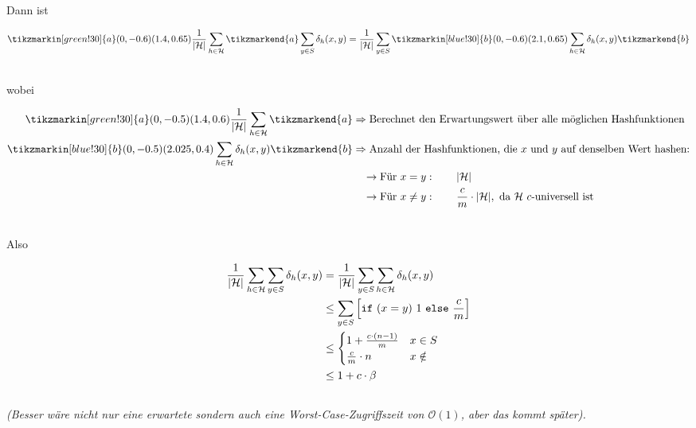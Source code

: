 \documentclass{scrartcl}%
\begin{document}
    Dann ist

    \begin{equation*}
        \begin{align*}
            \tikzmarkin[green!30]{a}(0,-0.6)(1.4,0.65) \frac{1}{|\mathcal{H}|} \sum_{h \in \mathcal{H}}\tikzmarkend{a}
            \sum_{y \in S}\delta_h(x,y) &= \frac{1}{|\mathcal{H}|}\sum_{y \in S} \tikzmarkin[blue!30]{b}(0,-0.6)(2.1,0.65)\sum_{h \in \mathcal{H}}\delta_h(x,y)\tikzmarkend{b} \\\nonumber
        \end{align*}
    \end{equation*}

    wobei

    \begin{equation*}
        \begin{align*}
            \tikzmarkin[green!30]{a}(0,-0.5)(1.4,0.6) \frac{1}{|\mathcal{H}|} \sum_{h \in \mathcal{H}}\tikzmarkend{a}
            &\Rightarrow \text{Berechnet den Erwartungswert über alle möglichen Hashfunktionen}  \\\nonumber
            \tikzmarkin[blue!30]{b}(0,-0.5)(2.025,0.4)\sum_{h \in \mathcal{H}}\delta_h(x,y)\tikzmarkend{b}
            &\Rightarrow \text{Anzahl der Hashfunktionen, die $x$ und $y$ auf denselben Wert hashen:} \\\nonumber
            & \phantom{\Rightarrow} \rightarrow \text{Für } x = y: \qquad |\mathcal{H}|\\\nonumber
            & \phantom{\Rightarrow} \rightarrow \text{Für } x \neq y: \qquad \frac{c}{m} \cdot |\mathcal{H}|,
            \text{ da $\mathcal{H}\ c$-universell ist }\\\nonumber
        \end{align*}
    \end{equation*}

    Also

    \begin{equation*}
        \begin{align*}
            \frac{1}{|\mathcal{H}|} \sum_{h \in \mathcal{H}} \sum_{y \in S}\delta_h(x,y) &= \frac{1}{|\mathcal{H}|}\sum_{y \in S} \sum_{h \in \mathcal{H}}\delta_h(x,y) \\\nonumber
            & \leq \sum_{y \in S}\left[\text{\texttt{if} $(x=y)$ $1$ \texttt{else} } \frac{c}{m}\right] \\\nonumber
            & \leq \begin{cases}
                       1 + \frac{c \cdot (n-1)}{m} & x \in S \\
                       \frac{c}{m} \cdot n & x \notin
            \end{cases} \\\nonumber
            & \leq 1 + c \cdot \beta \\\nonumber
        \end{align*}
    \end{equation*}
    \textit{(Besser wäre nicht nur eine erwartete sondern auch eine Worst-Case-Zugriffszeit von $\mathcal{O}(1)$, aber das kommt später).}
    \proofend
\end{document}
